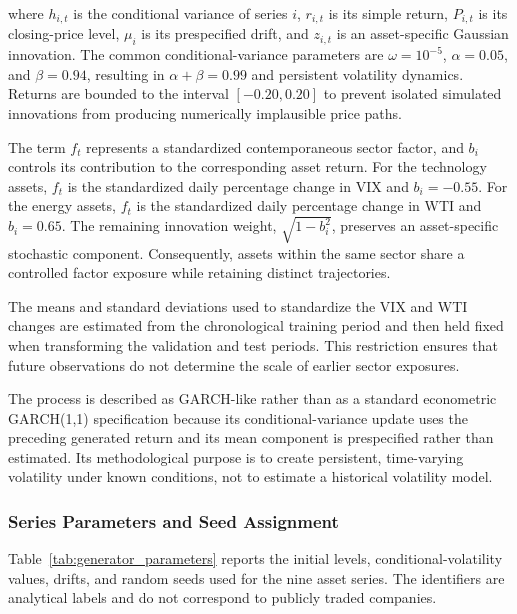\documentclass[utf8]{FrontiersinHarvard} %
\begin{document}
where \(h_{i,t}\) is the conditional variance of series \(i\), \(r_{i,t}\) is its simple return, \(P_{i,t}\) is its closing-price level, \(\mu_i\) is its prespecified drift, and \(z_{i,t}\) is an asset-specific Gaussian innovation. The common conditional-variance parameters are \(\omega=10^{-5}\), \(\alpha=0.05\), and \(\beta=0.94\), resulting in \(\alpha+\beta=0.99\) and persistent volatility dynamics. Returns are bounded to the interval \([-0.20,0.20]\) to prevent isolated simulated innovations from producing numerically implausible price paths.

The term \(f_t\) represents a standardized contemporaneous sector factor, and \(b_i\) controls its contribution to the corresponding asset return. For the technology assets, \(f_t\) is the standardized daily percentage change in VIX and \(b_i=-0.55\). For the energy assets, \(f_t\) is the standardized daily percentage change in WTI and \(b_i=0.65\). The remaining innovation weight, \(\sqrt{1-b_i^2}\), preserves an asset-specific stochastic component. Consequently, assets within the same sector share a controlled factor exposure while retaining distinct trajectories.

The means and standard deviations used to standardize the VIX and WTI changes are estimated from the chronological training period and then held fixed when transforming the validation and test periods. This restriction ensures that future observations do not determine the scale of earlier sector exposures.

The process is described as GARCH-like rather than as a standard econometric GARCH(1,1) specification because its conditional-variance update uses the preceding generated return and its mean component is prespecified rather than estimated. Its methodological purpose is to create persistent, time-varying volatility under known conditions, not to estimate a historical volatility model.

\subsubsection{Series Parameters and Seed Assignment}

Table~\ref{tab:generator_parameters} reports the initial levels, conditional-volatility values, drifts, and random seeds used for the nine asset series. The identifiers are analytical labels and do not correspond to publicly traded companies.
\end{document}
